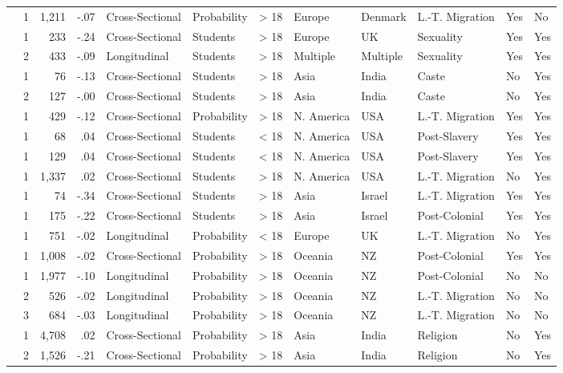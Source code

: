 \documentclass[10pt, letterpaper]{article}
\begin{document}
\begin{landscape}
\begin{xltabular}{650pt}{Xrrrllrlllll}
\cite{3051} & 1 & 1,211 & -.07 & Cross-Sectional & Probability & > 18 & Europe & Denmark & L.-T. Migration & Yes & No\\
\cite{956} & 1 & 233 & -.24 & Cross-Sectional & Students & > 18 & Europe & UK & Sexuality & Yes & Yes\\
 & 2 & 433 & -.09 & Longitudinal & Students & > 18 & Multiple & Multiple & Sexuality & Yes & Yes\\
\cite{2380} & 1 & 76 & -.13 & Cross-Sectional & Students & > 18 & Asia & India & Caste & No & Yes\\
 & 2 & 127 & -.00 & Cross-Sectional & Students & > 18 & Asia & India & Caste & No & Yes\\
\cite{803} & 1 & 429 & -.12 & Cross-Sectional & Probability & > 18 & N. America & USA & L.-T. Migration & Yes & Yes\\
\cite{703} & 1 & 68 & .04 & Cross-Sectional & Students & < 18 & N. America & USA & Post-Slavery & Yes & Yes\\
\cite{244} & 1 & 129 & .04 & Cross-Sectional & Students & < 18 & N. America & USA & Post-Slavery & Yes & Yes\\
\cite{2333} & 1 & 1,337 & .02 & Cross-Sectional & Students & > 18 & N. America & USA & L.-T. Migration & No & Yes\\
\cite{4005} & 1 & 74 & -.34 & Cross-Sectional & Students & > 18 & Asia & Israel & L.-T. Migration & Yes & Yes\\
\cite{813} & 1 & 175 & -.22 & Cross-Sectional & Students & > 18 & Asia & Israel & Post-Colonial & Yes & Yes\\
\cite{2382} & 1 & 751 & -.02 & Longitudinal & Probability & < 18 & Europe & UK & L.-T. Migration & No & Yes\\
\cite{1695} & 1 & 1,008 & -.02 & Cross-Sectional & Probability & > 18 & Oceania & NZ & Post-Colonial & Yes & Yes\\
\cite{2381} & 1 & 1,977 & -.10 & Longitudinal & Probability & > 18 & Oceania & NZ & Post-Colonial & No & No\\
 & 2 & 526 & -.02 & Longitudinal & Probability & > 18 & Oceania & NZ & L.-T. Migration & No & No\\
 & 3 & 684 & -.03 & Longitudinal & Probability & > 18 & Oceania & NZ & L.-T. Migration & No & No\\
\cite{2385} & 1 & 4,708 & .02 & Cross-Sectional & Probability & > 18 & Asia & India & Religion & No & Yes\\
 & 2 & 1,526 & -.21 & Cross-Sectional & Probability & > 18 & Asia & India & Religion & No & Yes\\

\end{xltabular}
\end{landscape}
\end{document}

